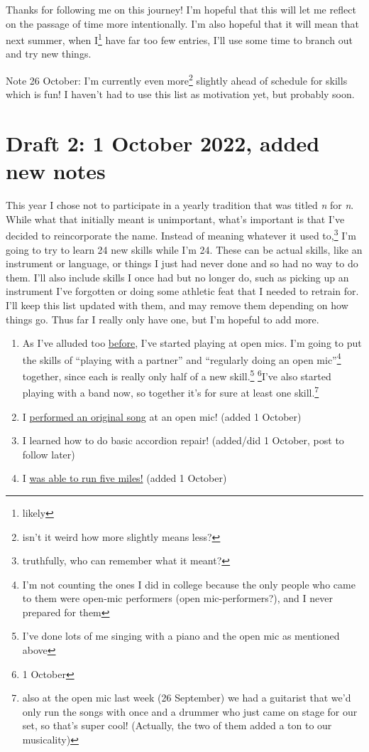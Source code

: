 \documentclass[12pt]{article}[titlepage]
\newcommand{\say}[1]{``#1''}
\newcommand{\1}{\={a}}
\newcommand{\2}{\={e}}
\newcommand{\3}{\={\i}}
\newcommand{\4}{\=o}
\newcommand{\5}{\=u}
\newcommand{\6}{\={A}}
\renewcommand{\,}{\textsuperscript{,}}
\begin{document}
Thanks for following me on this journey!
I'm hopeful that this will let me reflect on the passage of time more intentionally.
I'm also hopeful that it will mean that next summer, when I\footnote{likely} have far too few entries, I'll use some time to branch out and try new things.

Note 26 October: I'm currently even more\footnote{isn't it weird how more slightly means less?} slightly ahead of schedule for skills which is fun! 
I haven't had to use this list as motivation yet, but probably soon.


\section{Draft 2: 1 October 2022, added new notes}
This year I chose not to participate in a yearly tradition that was titled \textit{n} for \textit{n}.
While what that initially meant is unimportant, what's important is that I've decided to reincorporate the name.
Instead of meaning whatever it used to,\footnote{truthfully, who can remember what it meant?} I'm going to try to learn 24 new skills while I'm 24.
These can be actual skills, like an instrument or language, or things I just had never done and so had no way to do them.
I'll also include skills I once had but no longer do, such as picking up an instrument I've forgotten or doing some athletic feat that I needed to retrain for.
I'll keep this list updated with them, and may remove them depending on how things go.
Thus far I really only have one, but I'm hopeful to add more.

\begin{enumerate}
\item As I've alluded too \href{open-mic-2.html}{before}, I've started playing at open mics.
I'm going to put the skills of \say{playing with a partner} and \say{regularly doing an open mic}\footnote{I'm not counting the ones I did in college because the only people who came to them were open-mic performers (open mic-performers?), and I never prepared for them} together, since each is really only half of a new skill.\footnote{I've done lots of me singing with a piano and the open mic as mentioned above} \footnote{1 October}I've also started playing with a band now, so together it's for sure at least one skill.\footnote{also at the open mic last week (26 September) we had a guitarist that we'd only run the songs with once and a drummer who just came on stage for our set, so that's super cool! (Actually, the two of them added a ton to our musicality)}
\item I \href{performing-a-song.html}{performed an original song} at an open mic! (added 1 October)
\item I learned how to do basic accordion repair! (added/did 1 October, post to follow later)
\item I \href{running-2.html}{was able to run five miles!} (added 1 October)
\end{enumerate}
\end{document}
